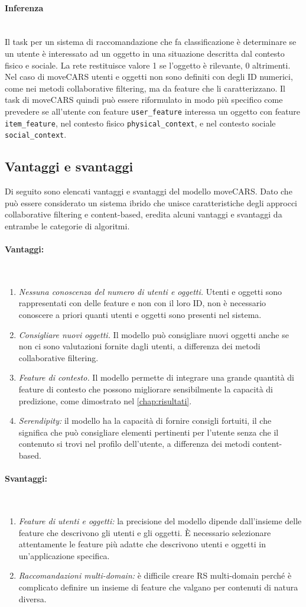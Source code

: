 \documentclass[12pt,italian]{report}
\newcommand{\myparagraph}[1]{\paragraph{#1}\mbox{}\\} %
\begin{document}
\myparagraph{Inferenza}
Il task per un sistema di raccomandazione che fa classificazione è determinare se un utente è interessato ad un oggetto in una situazione descritta dal contesto fisico e sociale. La rete restituisce valore 1 se l'oggetto è rilevante, 0 altrimenti. Nel caso di moveCARS utenti e oggetti non sono definiti con degli ID numerici, come nei metodi collaborative filtering, ma da feature che li caratterizzano. Il task di moveCARS quindi può essere riformulato in modo più specifico come prevedere se all'utente con feature \texttt{user\_feature} interessa un oggetto con feature \texttt{item\_feature}, nel contesto fisico \texttt{physical\_context}, e nel contesto sociale \texttt{social\_context}.

\subsection{Vantaggi e svantaggi}
Di seguito sono elencati vantaggi e svantaggi del modello moveCARS. Dato che può essere considerato un sistema ibrido che unisce caratteristiche degli approcci collaborative filtering e content-based, eredita alcuni vantaggi e svantaggi da entrambe le categorie di algoritmi.

\myparagraph{Vantaggi:}
\begin{enumerate}
 \item \textit{Nessuna conoscenza del numero di utenti e oggetti.} Utenti e oggetti sono rappresentati con delle feature e non con il loro ID, non è necessario conoscere a priori quanti utenti e oggetti sono presenti nel sistema.
 \item \textit{Consigliare nuovi oggetti.} Il modello può consigliare nuovi oggetti anche se non ci sono valutazioni fornite dagli utenti, a differenza dei metodi collaborative filtering.
 \item \textit{Feature di contesto.} Il modello permette di integrare una grande quantità di feature di contesto che possono migliorare sensibilmente la capacità di predizione, come dimostrato nel \autoref{chap:risultati}.
 \item \textit{Serendipity:} il modello ha la capacità di fornire consigli fortuiti, il che significa che può consigliare elementi pertinenti per l'utente senza che il contenuto si trovi nel profilo dell'utente, a differenza dei metodi content-based.
\end{enumerate}

\myparagraph{Svantaggi:}
\begin{enumerate}
 \item \textit{Feature di utenti e oggetti:} la precisione del modello dipende dall'insieme delle feature che descrivono gli utenti e gli oggetti. \`E necessario selezionare attentamente le feature più adatte che descrivono utenti e oggetti in un'applicazione specifica.
  
 \item \textit{Raccomandazioni multi-domain:} è difficile creare RS multi-domain perché è complicato definire un insieme di feature che valgano per contenuti di natura diversa.
\end{enumerate}
\end{document}
